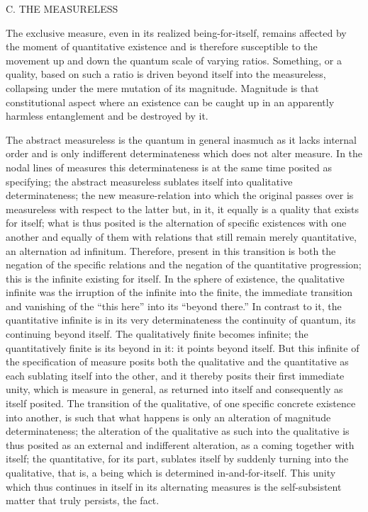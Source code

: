 C. THE MEASURELESS

The exclusive measure, even in its realized being-for-itself,
remains affected by the moment of quantitative existence
and is therefore susceptible to the movement up and down
the quantum scale of varying ratios.
Something, or a quality, based on such a ratio is driven
beyond itself into the measureless,
collapsing under the mere mutation of its magnitude.
Magnitude is that constitutional aspect
where an existence can be caught up in an apparently
harmless entanglement and be destroyed by it.

The abstract measureless is the quantum in general
inasmuch as it lacks internal order
and is only indifferent determinateness
which does not alter measure.
In the nodal lines of measures this determinateness is
at the same time  posited as specifying;
the abstract measureless sublates itself
into qualitative determinateness;
the new measure-relation into which
the original passes over is measureless
with respect to the latter
but, in it, it equally is a quality that exists for itself;
what is thus posited is the alternation of specific existences
with one another and equally of them with relations
that still remain merely quantitative,
an alternation ad infinitum.
Therefore, present in this transition is
both the negation of the specific relations
and the negation of the quantitative progression;
this is the infinite existing for itself.
In the sphere of existence, the qualitative infinite
was the irruption of the infinite into the finite,
the immediate transition and vanishing of
the “this here” into its “beyond there.”
In contrast to it, the quantitative infinite is
in its very determinateness the continuity of quantum,
its continuing beyond itself.
The qualitatively finite becomes infinite;
the quantitatively finite is its beyond in it:
it points beyond itself.
But this infinite of the specification of measure posits
both the qualitative and the quantitative as
each sublating itself into the other,
and it thereby posits their first immediate unity,
which is measure in general, as returned into itself
and consequently as itself posited.
The transition of the qualitative,
of one specific concrete existence into another,
is such that what happens is only
an alteration of magnitude determinateness;
the alteration of the qualitative
as such into the qualitative is thus posited as
an external and indifferent alteration,
as a coming together with itself;
the quantitative, for its part,
sublates itself by suddenly turning into the qualitative,
that is, a being which is determined in-and-for-itself.
This unity which thus continues in itself
in its alternating measures is
the self-subsistent matter that truly persists,
the fact.

